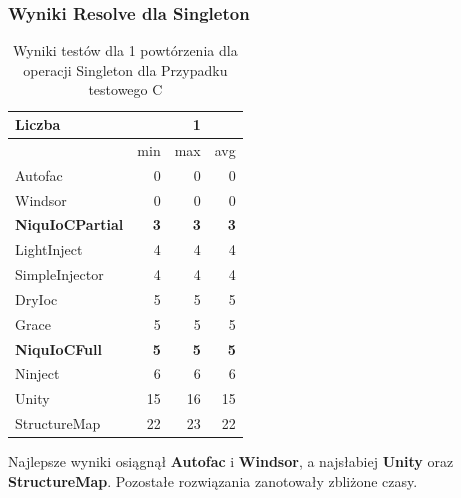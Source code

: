 \documentclass[12pt]{article}
\begin{document}
\subsubsection{Wyniki Resolve dla Singleton}
\begin{table}[H]
\captionsetup{belowskip=0pt,aboveskip=0pt}
\begin{center}
\begin{small}
	\begin{tabular}{ | l | r r r | }
    		\hline
Liczba & & 1 & \\ \hline
 & min & max & avg \\ \hline
Autofac & 0 & 0 & 0 \\ \hline
Windsor & 0 & 0 & 0 \\ \hline
\textbf{NiquIoCPartial} & \textbf{3} & \textbf{3} & \textbf{3} \\ \hline
LightInject & 4 & 4 & 4 \\ \hline
SimpleInjector & 4 & 4 & 4 \\ \hline
DryIoc & 5 & 5 & 5 \\ \hline
Grace & 5 & 5 & 5 \\ \hline
\textbf{NiquIoCFull} & \textbf{5} & \textbf{5} & \textbf{5} \\ \hline
Ninject & 6 & 6 & 6 \\ \hline
Unity & 15 & 16 & 15 \\ \hline
StructureMap & 22 & 23 & 22 \\ \hline
  	\end{tabular}
\end{small}
\end{center}
\caption{Wyniki testów dla 1 powtórzenia dla operacji Singleton dla Przypadku testowego C}
\label{TestCaseC_Singleton1}
\end{table}
Najlepsze wyniki osiągnął \textbf{Autofac} i \textbf{Windsor}, a najsłabiej \textbf{Unity} oraz \textbf{StructureMap}. Pozostałe rozwiązania zanotowały zbliżone czasy.
\\ \\
\end{document}
